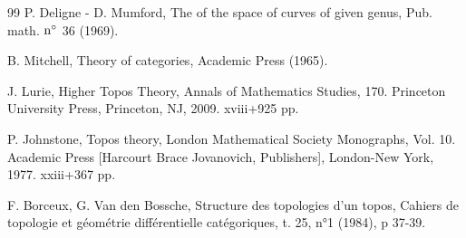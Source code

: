 \documentclass[10pt]{../fichiers-configuration-latex/smfart}
\begin{document}
\begin{thebibliography}{99}
 P. Deligne - D. Mumford, The  of
the space of curves of given genus, Pub. math. ${\rm n^{\circ}}$ 36
(1969).

 B. Mitchell, Theory of categories, Academic Press
(1965).

 J. Lurie, Higher Topos Theory, Annals of Mathematics Studies, 170. Princeton University Press, 
Princeton, NJ, 2009. xviii+925 pp.

  P. Johnstone, Topos theory, 
London Mathematical Society Monographs, Vol. 10. 
Academic Press [Harcourt Brace Jovanovich, Publishers], London-New York, 1977. xxiii+367 pp.

 F. Borceux, G. Van den Bossche, Structure des topologies
d'un topos, Cahiers de topologie et géométrie différentielle catégoriques,
t. 25, n°1 (1984), p 37-39.

\end{thebibliography}

\ifx\danslelivre\undefined
\end{document}
